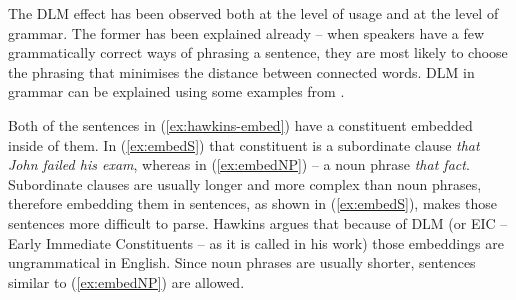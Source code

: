 The DLM effect has been observed both at the level of usage and at the level of grammar. The former has been explained already -- when speakers have a few grammatically correct ways of phrasing a sentence, they are most likely to choose the phrasing that minimises the distance between connected words. DLM in grammar can be explained using some examples from \cite{Hawkins-1994}. 
\begin{exe}
\ex\label{ex:hawkins-embed}
\begin{xlist}
	\label{ex:embedS}
	\label{ex:embedNP}
\end{xlist}
\end{exe}
Both of the sentences in (\ref{ex:hawkins-embed}) have a constituent embedded inside of them. In (\ref{ex:embedS}) that constituent is a subordinate clause \textsl{that John failed his exam}, whereas in (\ref{ex:embedNP}) -- a noun phrase \textsl{that fact}. Subordinate clauses are usually longer and more complex than noun phrases, therefore embedding them in sentences, as shown in (\ref{ex:embedS}), makes those sentences more difficult to parse. Hawkins argues that because of DLM (or EIC -- Early Immediate Constituents -- as it is called in his work) those embeddings are ungrammatical in English. Since noun phrases are usually shorter, sentences similar to (\ref{ex:embedNP}) are allowed. 

